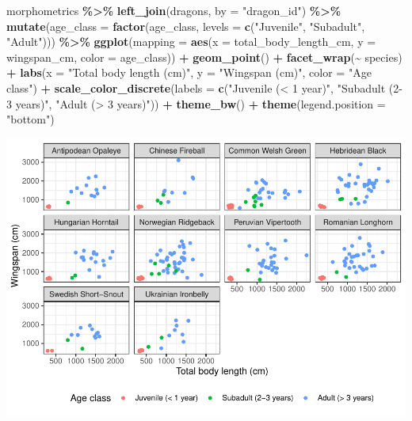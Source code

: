 \documentclass[
]{book}
\newenvironment{Shaded}{\begin{snugshade}}{\end{snugshade}}
\newcommand{\AttributeTok}[1]{\textcolor[rgb]{0.13,0.29,0.53}{#1}}
\newcommand{\FunctionTok}[1]{\textcolor[rgb]{0.13,0.29,0.53}{\textbf{#1}}}
\newcommand{\NormalTok}[1]{#1}
\newcommand{\SpecialCharTok}[1]{\textcolor[rgb]{0.81,0.36,0.00}{\textbf{#1}}}
\newcommand{\StringTok}[1]{\textcolor[rgb]{0.31,0.60,0.02}{#1}}
\begin{document}
\begin{Shaded}
\begin{Highlighting}[]
\NormalTok{morphometrics }\SpecialCharTok{\%\textgreater{}\%} 
  \FunctionTok{left\_join}\NormalTok{(dragons, }\AttributeTok{by =} \StringTok{"dragon\_id"}\NormalTok{) }\SpecialCharTok{\%\textgreater{}\%} 
  \FunctionTok{mutate}\NormalTok{(}\AttributeTok{age\_class =} \FunctionTok{factor}\NormalTok{(age\_class, }\AttributeTok{levels =} \FunctionTok{c}\NormalTok{(}\StringTok{"Juvenile"}\NormalTok{,}
                                                  \StringTok{"Subadult"}\NormalTok{,}
                                                  \StringTok{"Adult"}\NormalTok{))) }\SpecialCharTok{\%\textgreater{}\%} 
\FunctionTok{ggplot}\NormalTok{(}\AttributeTok{mapping =} \FunctionTok{aes}\NormalTok{(}\AttributeTok{x =}\NormalTok{ total\_body\_length\_cm, }\AttributeTok{y =}\NormalTok{ wingspan\_cm, }\AttributeTok{color =}\NormalTok{ age\_class)) }\SpecialCharTok{+}
  \FunctionTok{geom\_point}\NormalTok{() }\SpecialCharTok{+}
  \FunctionTok{facet\_wrap}\NormalTok{(}\SpecialCharTok{\textasciitilde{}}\NormalTok{ species) }\SpecialCharTok{+}
  \FunctionTok{labs}\NormalTok{(}\AttributeTok{x =} \StringTok{"Total body length (cm)"}\NormalTok{, }\AttributeTok{y =} \StringTok{"Wingspan (cm)"}\NormalTok{, }\AttributeTok{color =} \StringTok{"Age class"}\NormalTok{) }\SpecialCharTok{+}
  \FunctionTok{scale\_color\_discrete}\NormalTok{(}\AttributeTok{labels =} \FunctionTok{c}\NormalTok{(}\StringTok{"Juvenile (\textless{} 1 year)"}\NormalTok{,}
                                 \StringTok{"Subadult (2{-}3 years)"}\NormalTok{,}
                                 \StringTok{"Adult (\textgreater{} 3 years)"}\NormalTok{)) }\SpecialCharTok{+}
  \FunctionTok{theme\_bw}\NormalTok{() }\SpecialCharTok{+}
  \FunctionTok{theme}\NormalTok{(}\AttributeTok{legend.position =} \StringTok{"bottom"}\NormalTok{) }
\end{Highlighting}
\end{Shaded}

\includegraphics{reproducible-science_files/figure-latex/gg23b-1.pdf}
\end{document}
